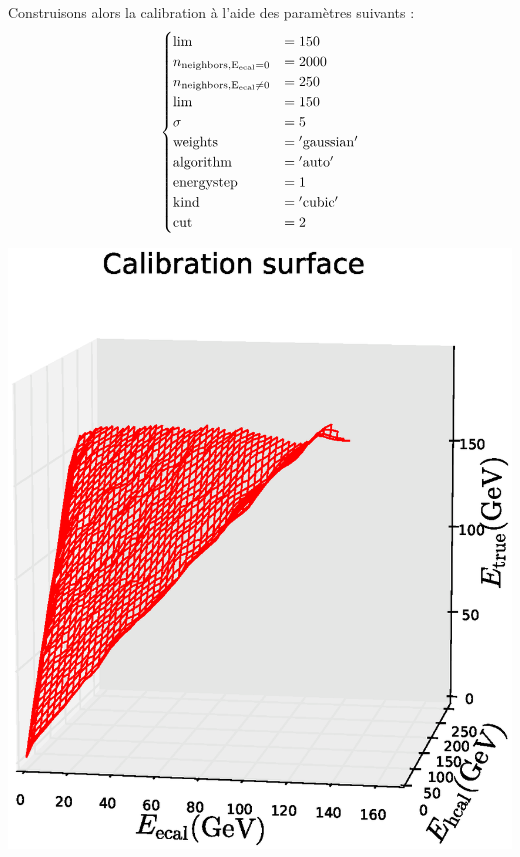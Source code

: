 \documentclass[11pt,a4paper]{article}
\begin{document}
\noindent
\begin{minipage}{0.6\linewidth}
Construisons alors la calibration  \cite{GitHubKNNGC} à l'aide des paramètres suivants : 
\[
\begin{cases}
\rm{lim} & = 150\\
n_{\rm neighbors, E_{\rm ecal} = 0} & = 2000\\
n_{\rm neighbors, E_{\rm ecal} \neq 0} & = 250\\
\rm{lim} & =150\\
\sigma  & = 5\\
\rm{weights} & = \rm{'gaussian'}\\
\rm{algorithm} & = \rm{'auto'}\\
\rm{energystep} & = 1\\
\rm{kind} & = \rm{'cubic'}\\
\rm{cut} & = 2\\
\end{cases}
\]
\end{minipage}
\begin{minipage}{0.4\linewidth}
	\includegraphics[width=\textwidth]{images/pictures/testKNNGC/KNNGaussianCleaning_plot3D_surf.eps}
	\label{surfKNNGC}
\end{minipage}
\end{document}
